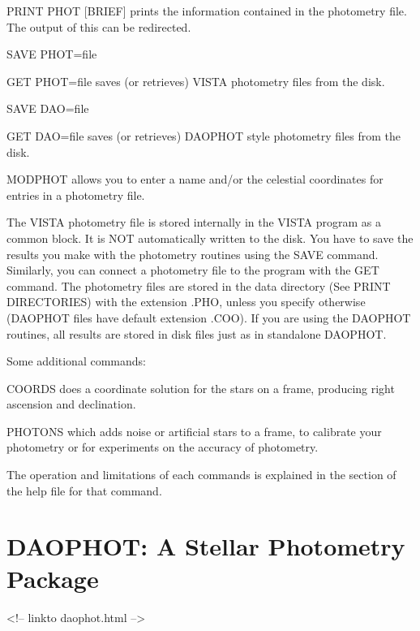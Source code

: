 \begin{example}
  \item[PRINT PHOT {[BRIEF]}\hfill]{prints the information contained in
       the photometry file.  The output of this can be redirected.}
  \item[SAVE PHOT=file\hfill]{}

  \item[GET PHOT=file\hfill]{saves (or retrieves) VISTA photometry
       files from the disk.}

  \item[SAVE DAO=file\hfill]{}

  \item[GET DAO=file \hfill]{saves (or retrieves) DAOPHOT style photometry
       files from the disk.}

  \item[MODPHOT\hfill]{allows you to enter a name and/or the
       celestial coordinates for entries in a photometry file.}
\end{example}
The VISTA photometry file is stored internally in the VISTA program as a
common block.  It is NOT automatically written to the disk. You have to
save the results you make with the photometry routines using the SAVE
command. Similarly, you can connect a photometry file to the program with
the GET command. The photometry files are stored in the data directory (See
PRINT DIRECTORIES) with the extension .PHO, unless you specify otherwise
(DAOPHOT files have default extension .COO).  If you are using the DAOPHOT
routines, all results are stored in disk files just as in standalone
DAOPHOT.

Some additional commands:
\begin{example}
  \item[COORDS\hfill]{does a coordinate solution for the stars
on a frame, producing right ascension and declination.}
  \item[PHOTONS\hfill]{which adds noise or artificial stars
to a frame, to calibrate your photometry
or for experiments on the accuracy of photometry.}
\end{example}
The operation and limitations of each commands is explained in
the section of the help file for that command. 


\section{DAOPHOT: A Stellar Photometry Package}
\begin{rawhtml}
<!-- linkto daophot.html -->
\end{rawhtml}

